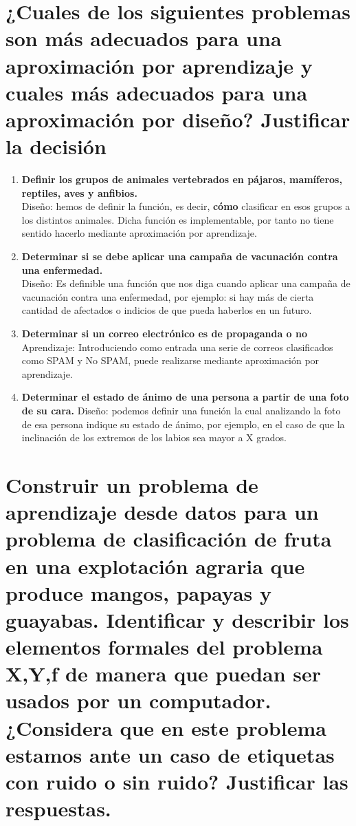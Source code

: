 \section{¿Cuales de los siguientes problemas son más adecuados para una aproximación por aprendizaje y cuales más adecuados para una aproximación por diseño? Justificar la decisión}

\begin{enumerate}
	\item  \textbf{Definir los grupos de animales vertebrados en pájaros, mamíferos, reptiles, aves y anfibios. }\\
	Diseño: hemos de definir la función, es decir, \textbf{cómo} clasificar en esos grupos a los distintos animales. Dicha función es implementable, por tanto no tiene sentido hacerlo mediante aproximación por aprendizaje.
	
	\item \textbf{Determinar si se debe aplicar una campaña de vacunación contra una enfermedad.} \\
	Diseño: Es definible una función que nos diga cuando aplicar una campaña de vacunación contra una enfermedad, por ejemplo: si hay más de cierta cantidad de afectados o indicios de que pueda haberlos en un futuro.
	\item \textbf{Determinar si un correo electrónico es de propaganda o no} \\
	Aprendizaje: Introduciendo como entrada una serie de correos clasificados como SPAM y No SPAM, puede realizarse mediante aproximación por aprendizaje.
	\item\textbf{Determinar el estado de ánimo de una persona a partir de una foto de su cara. }
	Diseño: podemos definir una función la cual analizando la foto de esa persona indique su estado de ánimo, por ejemplo, en el caso de que la inclinación de los extremos de los labios sea mayor a X grados.
\end{enumerate}


\newpage

\section{Construir un problema de aprendizaje desde datos para un problema de clasificación de fruta en una explotación agraria que produce mangos, papayas y guayabas. Identificar y describir los elementos formales del problema X,Y,f de manera que puedan ser usados por un computador. ¿Considera que en este problema estamos ante un caso de etiquetas con ruido o sin ruido? Justificar las respuestas.}

